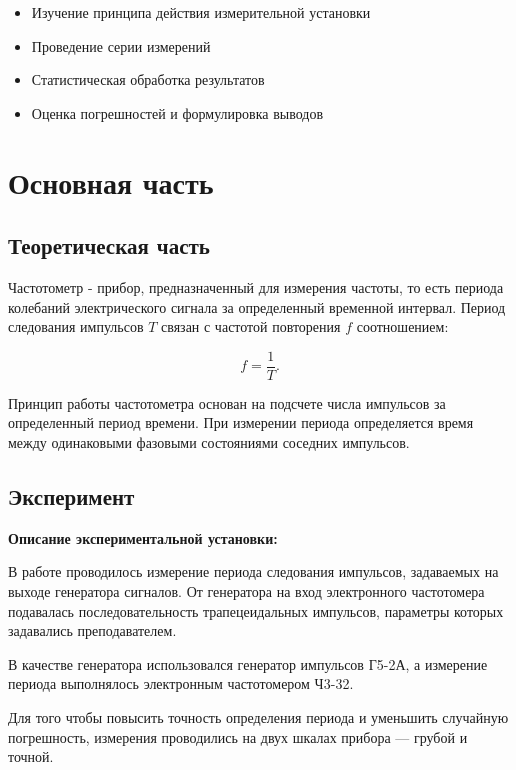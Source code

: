 \documentclass[a4paper,14pt]{extarticle}
\begin{document}
\begin{itemize}
\item Изучение принципа действия измерительной установки
\item Проведение серии измерений
\item Статистическая обработка результатов
\item Оценка погрешностей и формулировка выводов
\end{itemize}

\newpage

\section{Основная часть}

\subsection{Теоретическая часть}

Частотометр - прибор, предназначенный для измерения частоты, то есть периода колебаний электрического сигнала за определенный временной интервал. 
Период следования импульсов \(T\) связан с частотой повторения \(f\) соотношением:

\begin{equation}
f = \frac{1}{T}.
\end{equation}

Принцип работы частотометра основан на подсчете числа импульсов за определенный период времени. При измерении периода определяется время между одинаковыми фазовыми состояниями соседних импульсов.


\subsection{Эксперимент}
\textbf{Описание экспериментальной установки:}

В работе проводилось измерение периода следования импульсов, задаваемых на выходе генератора сигналов. От генератора на вход электронного частотомера подавалась последовательность трапецеидальных импульсов, параметры которых задавались преподавателем.

В качестве генератора использовался генератор импульсов Г5-2А, а измерение периода выполнялось электронным частотомером Ч3-32.

Для того чтобы повысить точность определения периода и уменьшить случайную погрешность, измерения проводились на двух шкалах прибора — грубой и точной.
\end{document}

